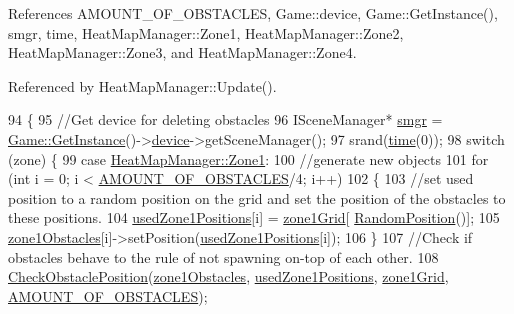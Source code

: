 References A\-M\-O\-U\-N\-T\-\_\-\-O\-F\-\_\-\-O\-B\-S\-T\-A\-C\-L\-E\-S, Game\-::device, Game\-::\-Get\-Instance(), smgr, time, Heat\-Map\-Manager\-::\-Zone1, Heat\-Map\-Manager\-::\-Zone2, Heat\-Map\-Manager\-::\-Zone3, and Heat\-Map\-Manager\-::\-Zone4.



Referenced by Heat\-Map\-Manager\-::\-Update().


\begin{DoxyCode}
94 \{
95     \textcolor{comment}{//Get device for deleting obstacles}
96     ISceneManager* \hyperlink{_game_8cpp_a80a0cf5a63a07fec786bf483e5f22c39}{smgr} = \hyperlink{class_game_aa989d3cee96d5ae093663bf62dea57e2}{Game::GetInstance}()->\hyperlink{class_game_a4968552e2ba3037d494596a908eccc00}{device}->getSceneManager();
97     srand(\hyperlink{_player_8cpp_ab683520676b99a7bcc7a6299eb886247}{time}(0));
98     \textcolor{keywordflow}{switch} (zone) \{
99     \textcolor{keywordflow}{case} \hyperlink{class_heat_map_manager_a6d43bc39106e6d2e72437f8902a586b6ac12fb3749b1e4eb1e472927e11bfd45b}{HeatMapManager::Zone1}:
100         \textcolor{comment}{//generate new objects}
101         \textcolor{keywordflow}{for} (\textcolor{keywordtype}{int} i = 0; i < \hyperlink{_object_placement_generation_8h_ae3ce5573806c4a01f588d56bfec823cb}{AMOUNT\_OF\_OBSTACLES}/4; i++)
102         \{
103             \textcolor{comment}{//set used position to a random position on the grid and set the position of the obstacles to
       these positions.}
104             \hyperlink{class_object_placement_generation_a118140096bceaa4572e47a633f368cbb}{usedZone1Positions}[i] = \hyperlink{class_object_placement_generation_aad1c9c2a56afd002bb8b551232292d65}{zone1Grid}[
      \hyperlink{class_object_placement_generation_a3fcec4d57ec62f0a38d9a741f30ffc0f}{RandomPosition}()];
105             \hyperlink{class_object_placement_generation_a2718f963a994625bafdc65c84cb821ef}{zone1Obstacles}[i]->setPosition(\hyperlink{class_object_placement_generation_a118140096bceaa4572e47a633f368cbb}{usedZone1Positions}[i]);
106         \}
107         \textcolor{comment}{//Check if obstacles behave to the rule of not spawning on-top of each other.}
108         \hyperlink{class_object_placement_generation_ae5ad2c3a1d486640f7bb4f53ca51e194}{CheckObstaclePosition}(\hyperlink{class_object_placement_generation_a2718f963a994625bafdc65c84cb821ef}{zone1Obstacles}, 
      \hyperlink{class_object_placement_generation_a118140096bceaa4572e47a633f368cbb}{usedZone1Positions}, \hyperlink{class_object_placement_generation_aad1c9c2a56afd002bb8b551232292d65}{zone1Grid}, \hyperlink{_object_placement_generation_8h_ae3ce5573806c4a01f588d56bfec823cb}{AMOUNT\_OF\_OBSTACLES});

\end{DoxyCode}
